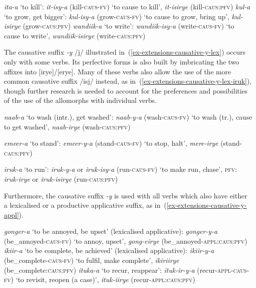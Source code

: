 \ea \label{ex-extensions-causative-isy}
\begin{xlist}
\ex\textit{ita-a} `to kill':  \textit{it-isy-a} (kill-\textsc{caus}-\textsc{fv}) `to cause to kill', \textit{it-isirye} (kill-\textsc{caus}:\textsc{pfv})
\ex\textit{kul-a} `to grow, get bigger':  \textit{kul-isy-a} (grow-\textsc{caus}-\textsc{fv}) `to cause to grow, bring up', \textit{kul-isirye} (grow-\textsc{caus}:\textsc{pfv})
\ex\textit{wandiik-a} `to write':  \textit{wandiik-isy-a} (write-\textsc{caus}-\textsc{fv}) `to cause to write', \textit{wandiik-isirye} (write-\textsc{caus}:\textsc{pfv})
\end{xlist}
\z

The causative suffix \textit{-y} /j/ illustrated in~(\ref{ex-extensions-causative-y-lex}) occurs only with some verbs. 
Its perfective forms is also built by imbricating the two affixes into [irye]/[erye]. 
Many of these verbs also allow the use of the more common causative suffix /isj/ instead, as in~(\ref{ex-extensions-causative-y-lex-iruk}), though further research is needed to account for the preferences and possibilities of the use of the allomorphs with individual verbs.

\ea \label{ex-extensions-causative-y-lex}
\begin{xlist}

\ex\textit{naab-a} `to wash (intr.), get washed':  \textit{naab-y-a} (wash-\textsc{caus}-\textsc{fv}) `to wash (tr.), cause to get washed',  \textit{naab-irye} (wash-\textsc{caus}:\textsc{pfv})

\ex\textit{emeer-a} `to stand':  \textit{emeer-y-a} (stand-\textsc{caus}-\textsc{fv}) `to stop, halt', \textit{mere-irye} (stand-\textsc{caus}:\textsc{pfv})

\ex \label{ex-extensions-causative-y-lex-iruk}
\textit{iruk-a} `to run':  \textit{iruk-y-a} or \textit{iruk-isy-a} (run-\textsc{caus}-\textsc{fv}) `to make run, chase', \textsc{pfv}: \textit{iruk-irye} or \textit{iruk-isirye} (run-\textsc{caus}:\textsc{pfv})

\end{xlist}
\z

Furthermore, the causative suffix \textit{-y} is used with all verbs which also have either a lexicalised or a productive applicative suffix, as in~(\ref{ex-extensions-causative-y-appl}).

\ea \label{ex-extensions-causative-y-appl}
\begin{xlist}
\ex \textit{gonger-a} `to be annoyed, be upset' (lexicalised applicative):  \textit{gonger-y-a} (be\_annoyed-\textsc{caus}-\textsc{fv})  `to annoy, upset', \textit{gong-eirye} (be\_annoyed-\textsc{appl}:\textsc{caus}:\textsc{pfv})
\ex\textit{ikiir-a} `to be complete, be achieved' (lexicalised applicative):  \textit{ikiir-y-a} (be\_complete-\textsc{caus}-\textsc{fv})  `to fulfil, make complete', \textit{ikiriirye} (be\_complete:\textsc{caus}:\textsc{pfv})
\ex\textit{ituka-a} `to recur, reappear':  \textit{ituk-ir-y-a} (recur-\textsc{appl}-\textsc{caus}-\textsc{fv}) `to revisit, reopen (a case)', \textit{ituk-iirye} (recur-\textsc{appl}:\textsc{caus}:\textsc{pfv})
\end{xlist}
\z


